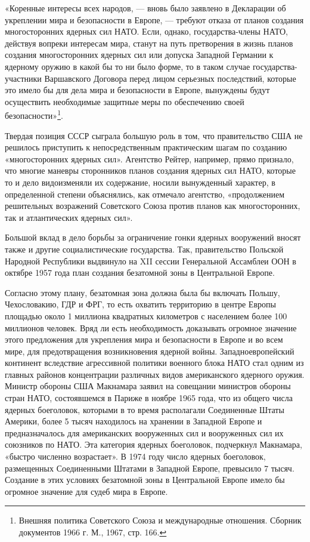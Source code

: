 \documentclass[12pt, a4paper, openany]{book}
\begin{document}
	«Коренные интересы всех народов, — вновь было заявлено в Декларации об укреплении мира и безопасности в Европе, — требуют отказа от планов создания многосторонних ядерных сил НАТО. Если, однако, государства-члены НАТО, действуя вопреки интересам мира, станут на путь претворения в жизнь планов создания многосторонних ядерных сил или допуска Западной Германии к ядерному оружию в какой бы то ни было форме, то в таком случае государства-участники Варшавского Договора перед лицом серьезных последствий, которые это имело бы для дела мира и безопасности в Европе, вынуждены будут осуществить необходимые защитные меры по обеспечению своей безопасности»{\footnote{Внешняя политика Советского Союза и международные отношения. Сборник документов 1966 г. М., 1967, стр. 166.}}.
	
	
	Твердая позиция СССР сыграла большую роль в том, что правительство США не решилось приступить к непосредственным практическим шагам по созданию «многосторонних ядерных сил». Агентство Рейтер, например, прямо признало, что многие маневры сторонников планов создания ядерных сил НАТО, которые то и дело видоизменяли их содержание, носили вынужденный характер, в определенной степени объяснялись, как отмечало агентство, «продолжением решительных возражений Советского Союза против планов как многосторонних, так и атлантических ядерных сил».
	
	Большой вклад в дело борьбы за ограничение гонки ядерных вооружений вносят также и другие социалистические государства. Так, правительство Польской Народной Республики выдвинуло на XII сессии Генеральной Ассамблеи ООН в октябре 1957 года план создания безатомной зоны в Центральной Европе.
	
	Согласно этому плану, безатомная зона должна была бы включать Польшу, Чехословакию, ГДР и ФРГ, то есть охватить территорию в центре Европы площадью около 1 миллиона квадратных километров с населением более 100 миллионов человек. Вряд ли есть необходимость доказывать огромное значение этого предложения для укрепления мира и безопасности в Европе и во всем мире, для предотвращения возникновения ядерной войны. Западноевропейский континент вследствие агрессивной политики военного блока НАТО стал одним из главных районов концентрации различных видов американского ядерного оружия. Министр обороны США Макнамара заявил на совещании министров обороны стран НАТО, состоявшемся в Париже в ноябре 1965 года, что из общего числа ядерных боеголовок, которыми в то время располагали Соединенные Штаты Америки, более 5 тысяч находилось на хранении в Западной Европе и предназначалось для американских вооруженных сил и вооруженных сил их союзников по НАТО. Эта категория ядерных боеголовок, подчеркнул Макнамара, «быстро численно возрастает». В 1974 году число ядерных боеголовок, размещенных Соединенными Штатами в Западной Европе, превысило 7 тысяч. Создание в этих условиях безатомной зоны в Центральной Европе имело бы огромное значение для судеб мира в Европе.
	
\end{document}
